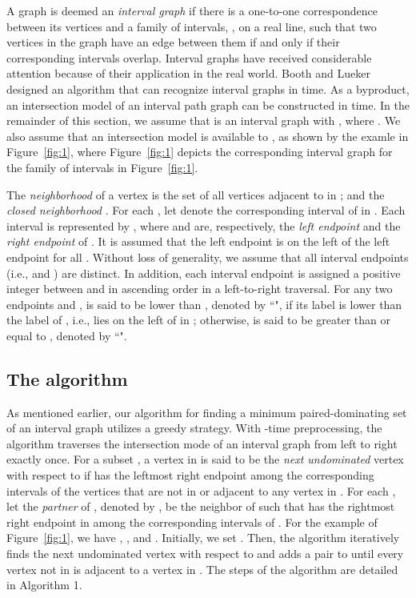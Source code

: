 \documentclass[12pt]{article}
\begin{document}
A graph  is deemed an {\em interval graph} if there is a
one-to-one correspondence between its vertices and a family of
intervals, , on a real line, such that two vertices in the
graph have an edge between them if and only if their corresponding
intervals overlap. Interval graphs have received considerable
attention because of their application in the real world. Booth
and Lueker~\cite{Booth76} designed an algorithm that can recognize
interval graphs in  time. As a byproduct, an
intersection model  of an interval path graph  can be
constructed in  time. In the remainder of this section,
we assume that  is an interval graph with , where . We also assume that an
intersection model  is available to , as shown by the examle
in Figure~\ref{fig:1}, where Figure~\ref{fig:1} depicts the
corresponding interval graph  for the family of intervals in
Figure~\ref{fig:1}.

The {\em neighborhood}  of a vertex  is the set of all
vertices adjacent to  in ; and the {\em closed neighborhood}
. For each , let 
denote the corresponding interval of  in . Each interval is
represented by , where  and  are,
respectively, the {\em left endpoint} and the {\em right endpoint}
of . It is assumed that the left endpoint  is on
the left of the left endpoint  for all . Without loss of generality, we assume that all interval
endpoints (i.e.,  and ) are distinct. In addition,
each interval endpoint is assigned a positive integer between 
and  in ascending order in a left-to-right traversal. For any
two endpoints  and ,  is said to be lower than ,
denoted by ``", if its label is lower than the label of
, i.e.,  lies on the left of  in ; otherwise,  is
said to be greater than or equal to , denoted by ``".


\subsection{The algorithm
                              \label{section:outline-algo-int}}
As mentioned earlier, our algorithm for finding a minimum
paired-dominating set of an interval graph utilizes a greedy
strategy. With -time preprocessing, the algorithm traverses
the intersection mode  of an interval graph  from left to
right exactly once. For a subset , a vertex 
in  is said to be the {\em next undominated} vertex with
respect to  if  has the leftmost right endpoint among the
corresponding intervals of the vertices that are not in  or
adjacent to any vertex in . For each , let the {\em
partner} of , denoted by , be the neighbor of  such
that  has the rightmost right endpoint in  among the
corresponding intervals of . For the example of
Figure~\ref{fig:1}, we have , ,
and . Initially, we set . Then, the
algorithm iteratively finds the next undominated vertex  with
respect to  and adds a pair  to  until every
vertex not in  is adjacent to a vertex in . The steps of the
algorithm are detailed in Algorithm 1.
\end{document}
